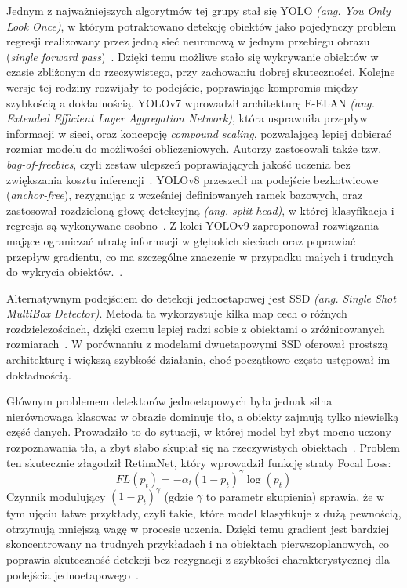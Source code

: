 Jednym z najważniejszych algorytmów tej grupy stał się YOLO \textit{(ang. You Only Look Once)}, w
którym potraktowano detekcję obiektów jako pojedynczy problem regresji realizowany przez jedną sieć
neuronową w jednym przebiegu obrazu (\textit{single forward pass})~\cite{redmon2016yolo}. Dzięki
temu możliwe stało się wykrywanie obiektów w czasie zbliżonym do rzeczywistego, przy zachowaniu
dobrej skuteczności. Kolejne wersje tej rodziny rozwijały to podejście, poprawiając kompromis
między szybkością a dokładnością. YOLOv7 wprowadził architekturę E-ELAN \textit{(ang. Extended
  Efficient Layer Aggregation Network)}, która usprawniła przepływ informacji w sieci, oraz koncepcję
\textit{compound scaling}, pozwalającą lepiej dobierać rozmiar modelu do możliwości obliczeniowych.
Autorzy zastosowali także tzw. \textit{bag-of-freebies}, czyli zestaw ulepszeń poprawiających
jakość uczenia bez zwiększania kosztu inferencji~\cite{wang2023yolov7}. YOLOv8 przeszedł na
podejście bezkotwicowe (\textit{anchor-free}), rezygnując z wcześniej definiowanych ramek bazowych,
oraz zastosował rozdzieloną głowę detekcyjną \textit{(ang. split head)}, w której klasyfikacja i
regresja są wykonywane osobno~\cite{ultralytics2023yolov8}. Z kolei YOLOv9 zaproponował rozwiązania
mające ograniczać utratę informacji w głębokich sieciach oraz poprawiać przepływ gradientu, co ma
szczególne znaczenie w przypadku małych i trudnych do wykrycia obiektów.~\cite{wang2024yolov9}.

Alternatywnym podejściem do detekcji jednoetapowej jest SSD \textit{(ang. Single Shot MultiBox
  Detector)}. Metoda ta wykorzystuje kilka map cech o różnych rozdzielczościach, dzięki czemu lepiej
radzi sobie z obiektami o zróżnicowanych rozmiarach~\cite{liu2016ssd}. W porównaniu z modelami
dwuetapowymi SSD oferował prostszą architekturę i większą szybkość działania, choć początkowo
często ustępował im dokładnością.

Głównym problemem detektorów jednoetapowych była jednak silna nierównowaga klasowa: w obrazie
dominuje tło, a obiekty zajmują tylko niewielką część danych. Prowadziło to do sytuacji, w której
model był zbyt mocno uczony rozpoznawania tła, a zbyt słabo skupiał się na rzeczywistych
obiektach~\cite{lin2017focal}. Problem ten skutecznie złagodził RetinaNet, który wprowadził funkcję
straty Focal Loss:
\[
  FL(p_t)=-\alpha_t(1-p_t)^\gamma\log(p_t)
\]
Czynnik modulujący $(1 - p_t)^\gamma$ (gdzie $\gamma$ to parametr skupienia) sprawia, że w tym
ujęciu łatwe przykłady, czyli takie, które model klasyfikuje z dużą pewnością, otrzymują mniejszą
wagę w procesie uczenia. Dzięki temu gradient jest bardziej skoncentrowany na trudnych przykładach
i na obiektach pierwszoplanowych, co poprawia skuteczność detekcji bez rezygnacji z szybkości
charakterystycznej dla podejścia jednoetapowego~\cite{lin2017focal}.

